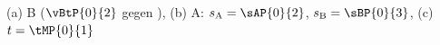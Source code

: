 (a) B ($\vBtP{0}{2}$ gegen \vAO), (b) A: $s_\mathrm{A} = \sAP{0}{2}$, $s_\mathrm{B} = \sBP{0}{3}$, (c) $t = \tMP{0}{1}$
